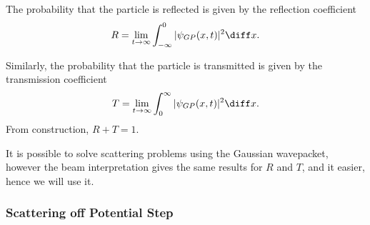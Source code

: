 \documentclass[12pt]{article}
\begin{document}
\begin{definition}
	The probability that the particle is reflected is given by the reflection coefficient
	\[
		R = \lim_{t \to \infty}\int_{-\infty}^{0} |\psi_{GP}(x, t)|^2\diff x
	.\]

	Similarly, the probability that the particle is transmitted is given by the transmission coefficient
	\[
		T = \lim_{t \to \infty} \int_{0}^{\infty} |\psi_{GP}(x, t)|^2\diff x
	.\]
	From construction, $R + T = 1$.
\end{definition}

It is possible to solve scattering problems using the Gaussian wavepacket, however the beam interpretation gives the same results for $R$ and $T$, and it easier, hence we will use it.

\subsubsection{Scattering off Potential Step}%
\label{subsub:scattering_off_potential_step}
\end{document}
